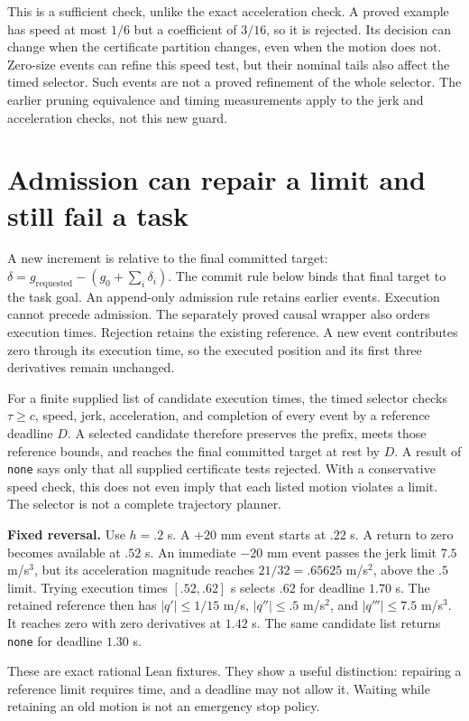 \documentclass[10pt,letterpaper]{article}
\begin{document}
This is a sufficient check, unlike the exact acceleration check. A proved
example has speed at most $1/6$ but a coefficient of $3/16$, so it is rejected.
Its decision can change when the certificate partition changes, even when
the motion does not. Zero-size events can refine this speed test, but their
nominal tails also affect the timed selector. Such events are not a proved
refinement of the whole selector. The earlier pruning equivalence and timing
measurements apply to the jerk and acceleration checks, not this new guard.

\section{Admission can repair a limit and still fail a task}
A new increment is relative to the final committed target:
$\delta=g_{\mathrm{requested}}-(g_0+\sum_i\delta_i)$.
The commit rule below binds that final target to the task goal. An append-only
admission rule retains earlier events. Execution cannot precede admission.
The separately proved causal wrapper also orders execution times. Rejection
retains the existing reference. A new event contributes zero through its
execution time, so the executed position and its first three derivatives remain
unchanged.

For a finite supplied list of candidate execution times, the timed selector
checks $\tau\geq c$, speed, jerk, acceleration, and completion of every event by a
reference deadline $D$. A selected candidate therefore preserves the prefix,
meets those reference bounds, and reaches the final committed target at rest
by $D$. A result of \texttt{none} says only that all supplied certificate tests
rejected. With a conservative speed check, this does not even imply that each
listed motion violates a limit. The selector is not a complete trajectory planner.

\textbf{Fixed reversal.} Use $h=.2$ s. A $+20$ mm event starts at $.22$ s.
A return to zero becomes available at $.52$ s. An immediate $-20$ mm event
passes the jerk limit $7.5$ m/s$^3$, but its acceleration magnitude reaches
$21/32=.65625$ m/s$^2$, above the $.5$ limit. Trying execution times
$[.52,.62]$ s selects $.62$ for deadline $1.70$ s. The retained reference then
has $|q'|\leq1/15$ m/s, $|q''|\leq.5$ m/s$^2$, and $|q'''|\leq7.5$ m/s$^3$.
It reaches zero with zero derivatives at $1.42$ s. The same candidate list
returns \texttt{none} for deadline $1.30$ s.

These are exact rational Lean fixtures. They show a useful distinction:
repairing a reference limit requires time, and a deadline may not allow it.
Waiting while retaining an old motion is not an emergency stop policy.
\end{document}

